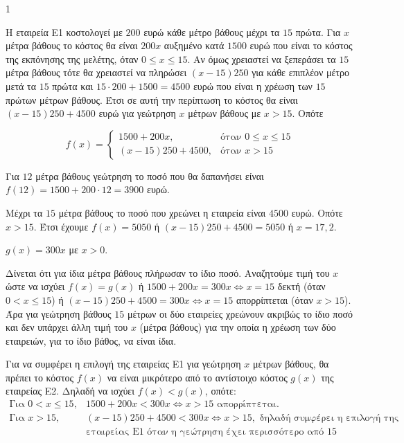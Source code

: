 \begin{ylh}{1}
    \item [Ύλη από εικόνα]
\end{ylh}
\begin{alist}
\item Η εταιρεία Ε1 κοστολογεί με $200$ ευρώ κάθε μέτρο βάθους μέχρι τα $15$ πρώτα. Για $x$ μέτρα βάθους το κόστος θα είναι $200x$ αυξημένο κατά $1500$ ευρώ που είναι το κόστος της εκπόνησης της μελέτης, όταν $0 \le x \le 15$. Αν όμως χρειαστεί να ξεπεράσει τα $15$ μέτρα βάθους τότε θα χρειαστεί να πληρώσει $(x-15)250$ για κάθε επιπλέον μέτρο μετά τα $15$ πρώτα και $15 \cdot 200 + 1500 = 4500$ ευρώ που είναι η χρέωση των $15$ πρώτων μέτρων βάθους. Έτσι σε αυτή την περίπτωση το κόστος θα είναι $(x-15)250 + 4500$ ευρώ για γεώτρηση $x$ μέτρων βάθους με $x > 15$. Οπότε
    \begin{rlist}
    \item \[
        f(x) = \begin{cases}
            1500 + 200x, & \text{όταν } 0 \le x \le 15 \\
            (x - 15)250 + 4500, & \text{όταν } x > 15
        \end{cases}
        \]
    \item Για $12$ μέτρα βάθους γεώτρηση το ποσό που θα δαπανήσει είναι $f(12) = 1500 + 200 \cdot 12 = 3900$ ευρώ.
    \item Μέχρι τα $15$ μέτρα βάθους το ποσό που χρεώνει η εταιρεία είναι $4500$ ευρώ. Οπότε $x > 15$. Έτσι έχουμε $f(x)=5050$ ή $(x-15)250 + 4500 = 5050$ ή $x=17,2$.

    \end{rlist}
\item $g(x) = 300x$ με $x>0$.
\item Δίνεται ότι για ίδια μέτρα βάθους πλήρωσαν το ίδιο ποσό. Αναζητούμε τιμή του $x$ ώστε να ισχύει $f(x) = g(x)$ ή $1500 + 200x = 300x \Leftrightarrow x=15$ δεκτή (όταν $0 < x \le 15$) ή $(x-15)250 + 4500= 300x \Leftrightarrow x=15$ απορρίπτεται (όταν $x > 15$).
    Άρα για γεώτρηση βάθους $15$ μέτρων οι δύο εταιρείες χρεώνουν ακριβώς το ίδιο ποσό και δεν υπάρχει άλλη τιμή του $x$ (μέτρα βάθους) για την οποία η χρέωση των δύο εταιρειών, για το ίδιο βάθος, να είναι ίδια.
\item Για να συμφέρει η επιλογή της εταιρείας Ε1 για γεώτρηση $x$ μέτρων βάθους, θα πρέπει το κόστος $f(x)$ να είναι μικρότερο από το αντίστοιχο κόστος $g(x)$ της εταιρείας Ε2. Δηλαδή να ισχύει $f(x) < g(x)$, οπότε:
    \[
    \begin{array}{ll}
        \text{Για } 0<x\le 15, & 1500+200x < 300x \Leftrightarrow x > 15 \text{ απορρίπτεται.} \\
        \text{Για } x > 15, & (x-15)250 + 4500 < 300x \Leftrightarrow x > 15, \text{ δηλαδή συμφέρει η επιλογή της} \\
        & \text{εταιρείας Ε1 όταν η γεώτρηση έχει περισσότερο από 15 μέτρα βάθους.}
    \end{array}
    \]
\end{alist}